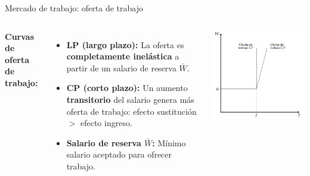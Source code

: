 \documentclass{beamer}
\begin{document}
\begin{frame}{Mercado de trabajo: oferta de trabajo}

\begin{columns}

\textbf{Curvas de oferta de trabajo:}
    \small
    \begin{itemize}
        \item \textbf{LP (largo plazo):}  
        La oferta es \textbf{completamente inelástica} a partir de un salario de reserva \(\bar{W}\).
        
        \item \textbf{CP (corto plazo):}  
        Un aumento \textbf{transitorio} del salario genera más oferta de trabajo:  
        efecto sustitución \(>\) efecto ingreso.

        \item \textbf{Salario de reserva \(\bar{W}\):}  
        Mínimo salario aceptado para ofrecer trabajo.
    \end{itemize}
        \centering
        \includegraphics[width=\linewidth]{../Figures/C34.4.png}
    \end{columns}
\end{frame}
\end{document}
